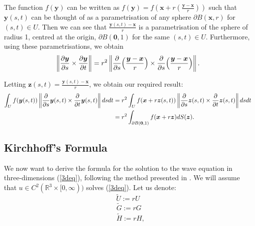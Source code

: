 \documentclass[a4paper, 12pt]{article}
\numberwithin{equation}{section}
\begin{document}
The function $f(\boldsymbol{y})$ can be written as
$f(\boldsymbol{y})=f(\boldsymbol{x}+r(\frac{\boldsymbol{y}-\boldsymbol{x}}{r}))$
such that $\boldsymbol{y}(s,t)$ can be thought of as a parametrisation of any
sphere $\partial B(\boldsymbol{x},r)$ for $(s,t)\in U$. Then we can see that
$\frac{\boldsymbol{y}(s,t)-\boldsymbol{x}}{r}$ is a parametrisation of the
sphere of radius 1, centred at the origin, $\partial B(\boldsymbol{0},1)$ for
the same $(s,t)\in U$. Furthermore, using these parametrisations, we obtain
\begin{equation*}
    \left \| \diffp[1]{\boldsymbol{y}}{s} \times \diffp[1]{\boldsymbol{y}}{t} \right \| =r^2 \left \| \diffp[1]{}{s}\Big(\frac{\boldsymbol{y}-\boldsymbol{x}}{r}\Big) \times \diffp[1]{}{s}\Big( \frac{\boldsymbol{y}-\boldsymbol{x}}{r}\Big) \right \|.
\end{equation*}

Letting $\boldsymbol{z}(s,t)=\frac{\boldsymbol{y}(s,t)-\boldsymbol{x}}{r}$, we
obtain our required result:
\begin{equation*}
    \begin{aligned}
    \int_U f(\boldsymbol{y}(s,t)) \left \| \diffp[1]{}{s}\boldsymbol{y}(s, t) \times \diffp{}{t}\boldsymbol{y}(s, t) \right \| dsdt&=r^2\int_U f(\boldsymbol{x}+r\boldsymbol{z}(s,t)) \left \| \diffp[1]{}{s}\boldsymbol{z}(s, t) \times \diffp[1]{}{t}\boldsymbol{z}(s, t) \right \| dsdt\\
    &=r^2\int_{\partial B(\boldsymbol{0},1)}f(\boldsymbol{x}+r\boldsymbol{z})dS(\boldsymbol{z}).
    \end{aligned}
\end{equation*}

\subsection{Kirchhoff's Formula}
We now want to derive the formula for the solution to the wave equation in
three-dimensions (\ref{3deq}), following the method presented in \cite[Ch. 2.4.1.c]{Ev}. We will assume that $u \in C^2(\mathbb{R}^3
\times [0, \infty))$ solves (\ref{3deq}). Let us denote:
\begin{equation} \label{Udash}
    \tilde{U}:=rU
\end{equation}
\begin{equation} \label{GHdash}
    \begin{aligned}
        &\tilde{G}:=rG\\
        &\tilde{H}:=rH,    
    \end{aligned}
\end{equation}
\end{document}
